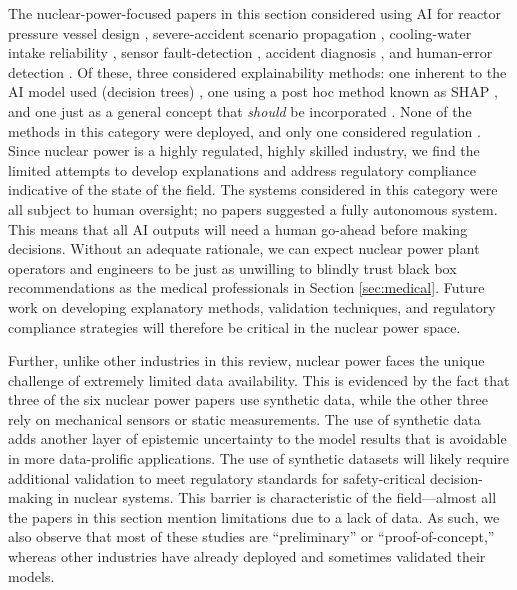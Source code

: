 \documentclass[authoryear,preprint,12pt]{elsarticle}
\begin{document}
The nuclear-power-focused papers in this section considered using AI for reactor
pressure vessel design \cite{yaoMechanicalBehaviorsInternal2024},
severe-accident scenario propagation
\cite{hossnyDistinctivePhysicalInsights2023}, cooling-water intake reliability
\cite{zhaoHumanmachineCooperationSafety2024}, sensor fault-detection
\cite{hongFaultIdentificationSignal2026}, accident diagnosis
\cite{chaeGraphNeuralNetwork2022}, and human-error detection
\cite{reddyUncertaintyawareExplainableHuman2024}. Of these, three considered
explainability methods: one inherent to the AI model used (decision trees)
\cite{hossnyDistinctivePhysicalInsights2023}, one using a post hoc method known
as SHAP \cite{reddyUncertaintyawareExplainableHuman2024}, and one just as a
general concept that \textit{should} be incorporated
\cite{zhaoHumanmachineCooperationSafety2024}. None of the methods in this
category were deployed, and only one considered regulation
\cite{hongFaultIdentificationSignal2026}. Since nuclear power is a highly
regulated, highly skilled industry, we find the limited attempts to develop
explanations and address regulatory compliance indicative of the state of the
field. The systems considered in this category were all subject to human
oversight; no papers suggested a fully autonomous system. This means that all AI
outputs will need a human go-ahead before making decisions. Without an adequate
rationale, we can expect nuclear power plant operators and engineers to be just
as unwilling to blindly trust black box recommendations as the medical
professionals in Section \ref{sec:medical}. Future work on developing
explanatory methods, validation techniques, and regulatory compliance strategies
will therefore be critical in the nuclear power space. 

Further, unlike other industries in this review, nuclear power faces the unique
challenge of extremely limited data availability. This is evidenced by the fact
that three of the six nuclear power papers use synthetic data, while the other
three rely on mechanical sensors or static measurements. The use of synthetic
data adds another layer of epistemic uncertainty to the model results that is
avoidable in more data-prolific applications. The use of synthetic datasets will
likely require additional validation to meet regulatory standards for
safety-critical decision-making in nuclear systems. This barrier is
characteristic of the field---almost all the papers in this section mention
limitations due to a lack of data. As such, we also observe that most of these
studies are ``preliminary'' or ``proof-of-concept,'' whereas other industries
have already deployed and sometimes validated their models. 
\end{document}
